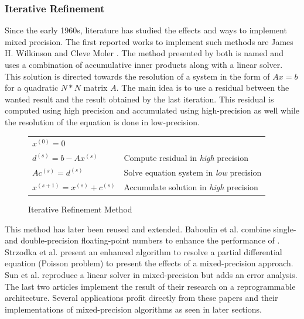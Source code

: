 \subsubsection{Iterative Refinement}

Since the early 1960s, literature has studied the effects and ways to implement mixed precision. The first reported works to implement such methods are James H. Wilkinson \cite{Wilkinson1994} and Cleve Moler \cite{Moler1967}. The method presented by both is named  and uses a combination of accumulative inner products along with a linear solver. This solution is directed towards the resolution of a system in the form of $Ax=b$ for a quadratic $N*N$ matrix $A$. The main idea is to use a residual between the wanted result and the result obtained by the last iteration. This residual is computed using high precision and accumulated using high-precision as well while the resolution of the equation is done in low-precision.

\begin{figure}[htbp]
	\centering
\begin{tabular}{ll}
	$x^{(0)}=0$ &\\
	$d^{(s)}=b-Ax^{(s)}$ & Compute residual in \emph{high} precision\\
	$Ac^{(s)}=d^{(s)}$ & Solve equation system in \emph{low} precision\\
	$x^{(s+1)}=x^{(s)}+c^{(s)}$ & Accumulate solution in \emph{high} precision\\
\end{tabular}
	\caption[Iterative Refinement]{Iterative Refinement Method \cite{Goddeke2007}}
	\label{fig:IterativeRef}
\end{figure}

This method has later been reused and extended. Baboulin et al. \cite{Baboulin2009} combine single- and double-precision floating-point numbers to enhance the performance of . Strzodka et al. \cite{Strzodka2006} present an enhanced algorithm to resolve a partial differential equation (Poisson problem) to present the effects of a mixed-precision approach. Sun et al. \cite{Sun2008} reproduce a linear solver in mixed-precision but adds an error analysis. The last two articles implement the result of their research on a reprogrammable architecture. Several applications profit directly from these papers and their implementations of mixed-precision algorithms as seen in later sections.

